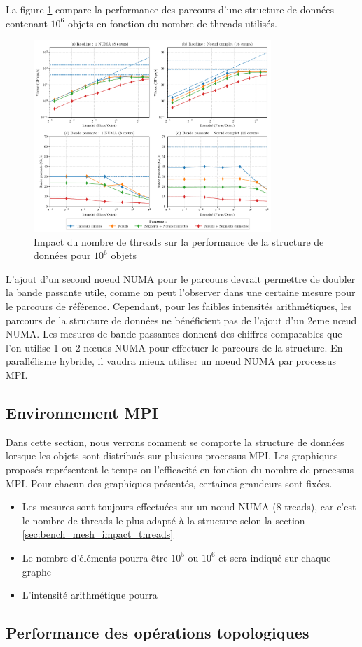 La figure \ref{fig:bench_mesh_effet_threads} compare la performance des parcours d'une structure de données contenant $10^6$ objets en fonction du nombre de threads utilisés.

\begin{figure}
    \centering
    \includegraphics[width=0.8\textwidth]{img/bench_mesh_omp_effet_threads.pdf}
    \caption{Impact du nombre de threads sur la performance de la structure de données pour $10^6$ objets}
    \label{fig:bench_mesh_effet_threads}
\end{figure}

L'ajout d'un second noeud NUMA pour le parcours devrait permettre de doubler la bande passante utile, comme on peut l'observer dans une certaine mesure pour le parcours de référence. Cependant, pour les faibles intensités arithmétiques, les parcours de la structure de données ne bénéficient pas de l'ajout d'un 2eme nœud NUMA. Les mesures de bande passantes donnent des chiffres comparables que l'on utilise 1 ou 2 nœuds NUMA pour effectuer le parcours de la structure. En parallélisme hybride, il vaudra mieux utiliser un noeud NUMA par processus MPI.

\subsection{Environnement MPI}

Dans cette section, nous verrons comment se comporte la structure de données lorsque les objets sont distribués sur plusieurs processus MPI. Les graphiques proposés représentent le temps ou l'efficacité en fonction du nombre de processus MPI. Pour chacun des graphiques présentés, certaines grandeurs sont fixées.
\begin{itemize}
    \item Les mesures sont toujours effectuées sur un nœud NUMA (8 treads), car c'est le nombre de threads le plus adapté à la structure selon la section \ref{sec:bench_mesh_impact_threads}
    \item Le nombre d'éléments pourra être $10^5$ ou $10^6$ et sera indiqué sur chaque graphe
    \item L'intensité arithmétique pourra 
\end{itemize}

\subsection{Performance des opérations topologiques}